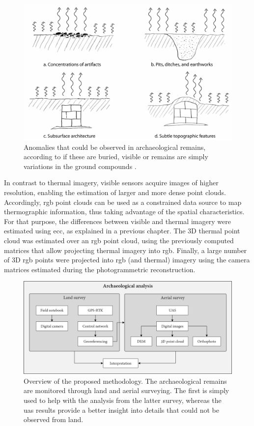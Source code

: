 \begin{figure}[ht]
    \centering
    \includegraphics[width=\linewidth]{figs/castle_puerta_arenas/thermal_exchanging.png}
	\caption{Anomalies that could be observed in archaeological remains, according to if these are buried, visible or remains are simply variations in the ground compounds \cite{casana_archaeological_2017}.}
	\label{fig:thermal_transfer}
\end{figure}

In contrast to thermal imagery, visible sensors acquire images of higher resolution, enabling the estimation of larger and more dense point clouds. Accordingly, \acrshort{rgb} point clouds can be used as a constrained data source to map thermographic information, thus taking advantage of the spatial characteristics. For that purpose, the differences between visible and thermal imagery were estimated using \acrshort{ecc}, as explained in a previous chapter. The 3D thermal point cloud was estimated over an \acrshort{rgb} point cloud, using the previously computed matrices that allow projecting thermal imagery into \acrshort{rgb}. Finally, a large number of 3D \acrshort{rgb} points were projected into \acrshort{rgb} (and thermal) imagery using the camera matrices estimated during the photogrammetric reconstruction. 

\begin{figure}[htbp]
   \centering
    \includegraphics[width=\linewidth]{figs/castle_puerta_arenas/overview.png}
   \caption{Overview of the proposed methodology. The archaeological remains are monitored through land and aerial surveying. The first is simply used to help with the analysis from the latter survey, whereas the \acrshort{uas} results provide a better insight into details that could not be observed from land.}
   \label{fig:thermal_analysis_overview}
\end{figure}

